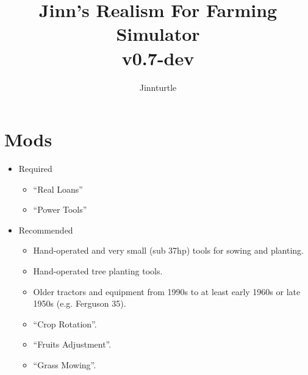 \documentclass[a4paper,10pt]{article}
\begin{document}
\newlength{\tabcolsepDefault}
\setlength{\tabcolsepDefault}{\tabcolsep}




\newcommand{\textbi}[1]{\textbf{\textit{#1}}}

\newcommand{\projName}{Jinn's Realism For Farming Simulator}
\newcommand{\projVersion}{v0.7-dev}


\title{\projName{}\\ \projVersion{}}
\author{Jinnturtle}

\maketitle
\tableofcontents

\section{Mods}

\begin{itemize}
\item Required
  \begin{itemize}
  \item ``Real Loans''
  \item ``Power Tools''
  \end{itemize}
\item Recommended
  \begin{itemize}
    \item Hand-operated and very small (sub 37hp) tools for sowing and planting.
    \item Hand-operated tree planting tools.
    \item Older tractors and equipment from 1990s to at least early 1960s or
      late 1950s (e.g.  Ferguson 35).
    \item ``Crop Rotation''.
    \item ``Fruits Adjustment''.
    \item ``Grass Mowing''.
  \end{itemize}
\end{itemize}
\end{document}
